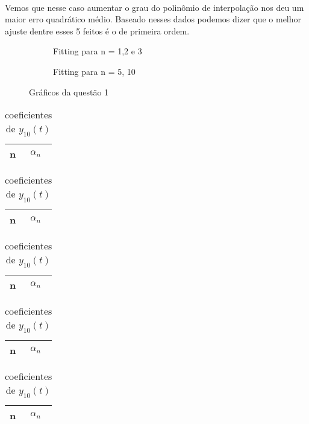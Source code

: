 \paragraph{}Vemos que nesse caso aumentar o grau do polinômio de
interpolação nos deu um maior erro quadrático médio. Baseado nesses
dados podemos dizer que o melhor ajuste dentre esses 5 feitos é o 
de primeira ordem. 

\FloatBarrier
\begin{figure}[!htp]
	\begin{subfigure}[!htp]{0.5\textwidth}
	
	\caption{Fitting para n = 1,2 e 3}
	\label{fig:quest1-a}
	\end{subfigure}

	\begin{subfigure}[!htp]{0.5\textwidth}
	
	\caption{Fitting para n = 5, 10}
	\label{fig:quest1-b}	
	\end{subfigure}
	\caption{Gráficos da questão 1}
\end{figure}
\FloatBarrier

\FloatBarrier
\begin{table}
\parbox{.45\linewidth}
		{
		\centering
		\begin{tabular}{|l|l|}\hline
			n & $\alpha_{n}$ \\ \hline
			
		\end{tabular}
		\caption{coeficientes de $y_1(t)$}
		\label{tab:quest1-X1}
		}
\parbox{.45\linewidth}
	{
	\centering
		\begin{tabular}{|l|l|}\hline
			n & $\alpha_{n}$ \\ \hline
			
		\end{tabular}
		\caption{coeficientes de $y_2(t)$}
		\label{tab:quest1-X2}	
	}

\parbox{.45\linewidth}
	{
	\centering
		\begin{tabular}{|l|l|}\hline
			n & $\alpha_{n}$ \\ \hline
			
		\end{tabular}
		\caption{coeficientes de $y_3(t)$}
		\label{tab:quest1-X3}
	}
\parbox{.45\linewidth}
	{
	\centering
		\begin{tabular}{|l|l|}\hline
			n & $\alpha_{n}$ \\ \hline
			
		\end{tabular}
		\caption{coeficientes de $y_5(t)$}
		\label{tab:quest1-X5}
	}
	
\parbox{.45\linewidth}
	{
	\centering
		\begin{tabular}{|l|l|}\hline
			n & $\alpha_{n}$ \\ \hline
			
		\end{tabular}
		\caption{coeficientes de $y_{10}(t)$}
		\label{tab:quest1-X10}
	}

\end{table}
\FloatBarrier

